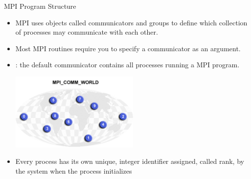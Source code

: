 \documentclass[10pt,t]{beamer}
\begin{document}
\begin{frame}{MPI Program Structure}
\begin{itemize}
\begin{center}
\begin{tabular}{|f|a|}
        \end{tabular}
      \end{center}
  \framebreak
  \item MPI uses objects called communicators and groups to define which collection of processes may communicate with each other.
  \item Most MPI routines require you to specify a communicator as an argument.
  \item {}: the default communicator contains all processes running a MPI program.
    \begin{center}
      \includegraphics[width=0.5\textwidth]{./comm_world}      
    \end{center}
  \item Every process has its own unique, integer identifier assigned, called rank, by the system when the process initializes
  \end{itemize}
\end{frame}
\end{document}
